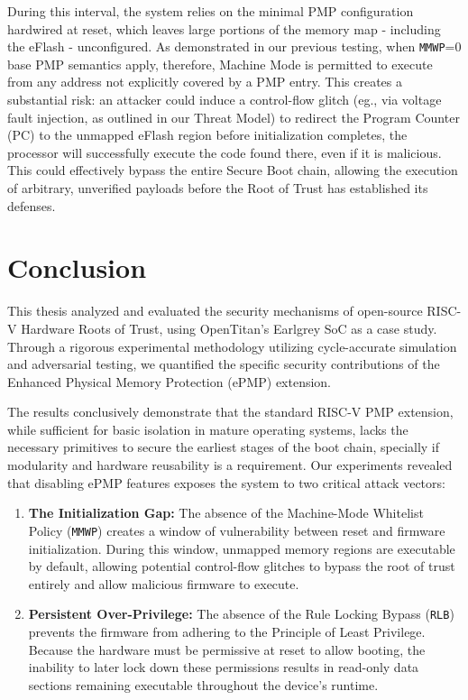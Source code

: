 \documentclass[10pt,a4paper,twocolumn,twoside]{article}
\begin{document}
During this interval, the system relies on the minimal PMP configuration hardwired at reset, which leaves large portions of the memory map - including the eFlash - unconfigured. As demonstrated in our previous testing, when \texttt{MMWP}=0 base PMP semantics apply, therefore, Machine Mode is permitted to execute from any address not explicitly covered by a PMP entry. This creates a substantial risk: an attacker could induce a control-flow glitch (eg., via voltage fault injection, as outlined in our Threat Model) to redirect the Program Counter (PC) to the unmapped eFlash region before initialization completes, the processor will successfully execute the code found there, even if it is malicious. This could effectively bypass the entire Secure Boot chain, allowing the execution of arbitrary, unverified payloads before the Root of Trust has established its defenses.
\section{Conclusion}
This thesis analyzed and evaluated the security mechanisms of open-source RISC-V Hardware Roots of Trust, using OpenTitan's Earlgrey SoC as a case study. Through a rigorous experimental methodology utilizing cycle-accurate simulation and adversarial testing, we quantified the specific security contributions of the Enhanced Physical Memory Protection (ePMP) extension.

The results conclusively demonstrate that the standard RISC-V PMP extension, while sufficient for basic isolation in mature operating systems, lacks the necessary primitives to secure the earliest stages of the boot chain, specially if modularity and hardware reusability is a requirement. Our experiments revealed that disabling ePMP features exposes the system to two critical attack vectors:

\begin{enumerate}
    \item \textbf{The Initialization Gap:} The absence of the Machine-Mode Whitelist Policy (\texttt{MMWP}) creates a window of vulnerability between reset and firmware initialization. During this window, unmapped memory regions are executable by default, allowing potential control-flow glitches to bypass the root of trust entirely and allow malicious firmware to execute.
    \item \textbf{Persistent Over-Privilege:} The absence of the Rule Locking Bypass (\texttt{RLB}) prevents the firmware from adhering to the Principle of Least Privilege. Because the hardware must be permissive at reset to allow booting, the inability to later lock down these permissions results in read-only data sections remaining executable throughout the device's runtime.
\end{enumerate}
\end{document}
